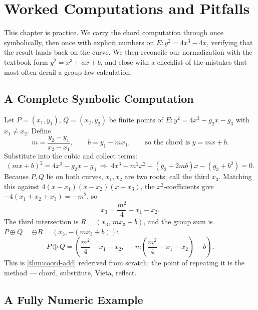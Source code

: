 \chapter{Worked Computations and Pitfalls}
\label{ch:worked_pitfalls}

This chapter is practice. We carry the chord computation through once
symbolically, then once with explicit numbers on \(E : y^2 = 4x^3 - 4x\),
verifying that the result lands back on the curve. We then reconcile our
normalization with the textbook form \(y^2 = x^3 + ax + b\), and close with a
checklist of the mistakes that most often derail a group-law calculation.

\section{A Complete Symbolic Computation}
\label{sec:wk-symbolic}

Let \(P = (x_1, y_1)\), \(Q = (x_2, y_2)\) be finite points of \(E : y^2 = 4x^3 -
g_2 x - g_3\) with \(x_1 \ne x_2\). Define
\[
  m = \frac{y_2 - y_1}{x_2 - x_1}, \qquad b = y_1 - m x_1,
  \qquad \text{so the chord is } y = mx + b .
\]
Substitute into the cubic and collect terms:
\[
  (mx + b)^2 = 4x^3 - g_2 x - g_3
  \;\Longrightarrow\;
  4x^3 - m^2 x^2 - (g_2 + 2mb)x - (g_3 + b^2) = 0 .
\]
Because \(P, Q\) lie on both curves, \(x_1, x_2\) are two roots; call the third
\(x_3\). Matching this against \(4(x - x_1)(x - x_2)(x - x_3)\), the
\(x^2\)-coefficients give \(-4(x_1 + x_2 + x_3) = -m^2\), so
\[
  x_3 = \frac{m^2}{4} - x_1 - x_2 .
\]
The third intersection is \(R = (x_3,\, m x_3 + b)\), and the group sum is
\(P \oplus Q = \ominus R = (x_3, -(m x_3 + b))\):
\[
  \boxed{\,
  P \oplus Q = \left( \frac{m^2}{4} - x_1 - x_2,\;
  -m\!\left( \frac{m^2}{4} - x_1 - x_2 \right) - b \right).
  \,}
\]
This is \cref{thm:coord-add} rederived from scratch; the point of repeating it is
the method --- chord, substitute, Vieta, reflect.

\section{A Fully Numeric Example}
\label{sec:wk-numeric}

